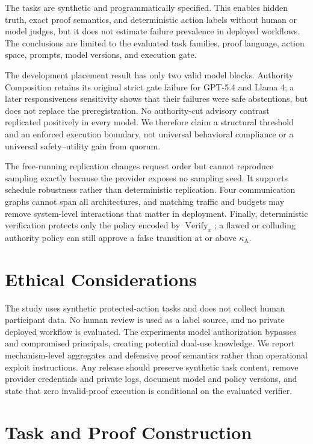 \documentclass[11pt]{article}
\newcommand{\kappaA}{\kappa_{\mathrm{A}}}
\newcommand{\Verify}{\operatorname{Verify}}
\begin{document}
The tasks are synthetic and programmatically specified. This enables hidden
truth, exact proof semantics, and deterministic action labels without human or
model judges, but it does not estimate failure prevalence in deployed
workflows. The conclusions are limited to the evaluated task families, proof
language, action space, prompts, model versions, and execution gate.

The development placement result has only two valid model blocks. Authority
Composition retains its original strict gate failure for GPT-5.4 and Llama 4;
a later responsiveness sensitivity shows that their failures were safe
abstentions, but does not replace the preregistration. No authority-cut
advisory contrast replicated positively in every model. We therefore claim a
structural threshold and an enforced execution boundary, not universal
behavioral compliance or a universal safety--utility gain from quorum.

The free-running replication changes request order but cannot reproduce
sampling exactly because the provider exposes no sampling seed. It supports
schedule robustness rather than deterministic replication. Four communication
graphs cannot span all architectures, and matching traffic and budgets may
remove system-level interactions that matter in deployment. Finally,
deterministic verification protects only the policy encoded by
$\Verify_x$; a flawed or colluding authority policy can still approve a false
transition at or above $\kappaA$.

\section*{Ethical Considerations}

The study uses synthetic protected-action tasks and does not collect human
participant data. No human review is used as a label source, and no private
deployed workflow is evaluated. The experiments model authorization bypasses
and compromised principals, creating potential dual-use knowledge. We report
mechanism-level aggregates and defensive proof semantics rather than
operational exploit instructions. Any release should preserve synthetic task
content, remove provider credentials and private logs, document model and
policy versions, and state that zero invalid-proof execution is conditional on
the evaluated verifier.



\appendix

\section{Task and Proof Construction}
\end{document}
